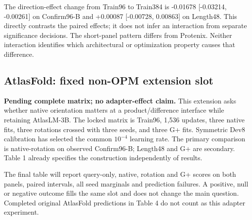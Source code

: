 The direction-effect change from Train96 to Train384 is
-0.01678 {[}-0.03214, -0.00261{]} on Confirm96-B and
+0.00087 {[}-0.00728, 0.00863{]} on Length48. This directly contrasts the paired
effects; it does not infer an interaction from separate significance decisions.
The short-panel pattern differs from Protenix. Neither interaction identifies
which architectural or optimization property causes that difference.

\subsection{AtlasFold: fixed non-OPM extension slot}\label{atlasfold-fixed-non-opm-extension-slot}

\textbf{Pending complete matrix; no adapter-effect claim.} This extension asks whether
native orientation matters at a product/difference interface while retaining
AtlasLM-3B. The locked matrix is Train96, 1,536 updates, three native fits,
three rotations crossed with three seeds, and three G+ fits. Symmetric Dev8
calibration has selected the common \(10^{-4}\) learning rate. The primary
comparison is native-rotation on observed Confirm96-B; Length48 and G+ are
secondary. Table 1 already specifies the construction independently of results.

The final table will report query-only, native, rotation and G+ scores on both
panels, paired intervals, all seed marginals and prediction failures. A positive,
null or negative outcome fills the same slot and does not change the main
question. Completed original AtlasFold predictions in Table 4 do not count as
this adapter experiment.
